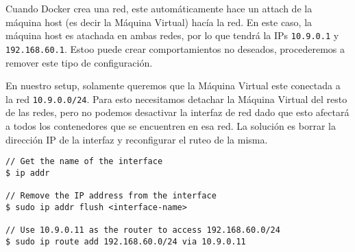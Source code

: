

Cuando Docker crea una red, este automáticamente hace un attach de la máquina host (es decir la Máquina Virtual) hacía la red. En este caso, la máquina host es atachada en ambas redes, por lo que tendrá la IPs \texttt{10.9.0.1} y
\texttt{192.168.60.1}.
Estoo puede crear comportamientos no deseados, procederemos a remover este tipo de configuración.

En nuestro setup, solamente queremos que la Máquina Virtual este conectada a la red \texttt{10.9.0.0/24}.
Para esto necesitamos detachar la Máquina Virtual del resto de las redes, pero no podemos desactivar la interfaz de red dado que esto afectará a todos los contenedores que se encuentren en esa red.
La solución es borrar la dirección IP de la interfaz y reconfigurar el ruteo de la misma.


\begin{lstlisting}
// Get the name of the interface 
$ ip addr

// Remove the IP address from the interface
$ sudo ip addr flush <interface-name>

// Use 10.9.0.11 as the router to access 192.168.60.0/24
$ sudo ip route add 192.168.60.0/24 via 10.9.0.11
\end{lstlisting}

